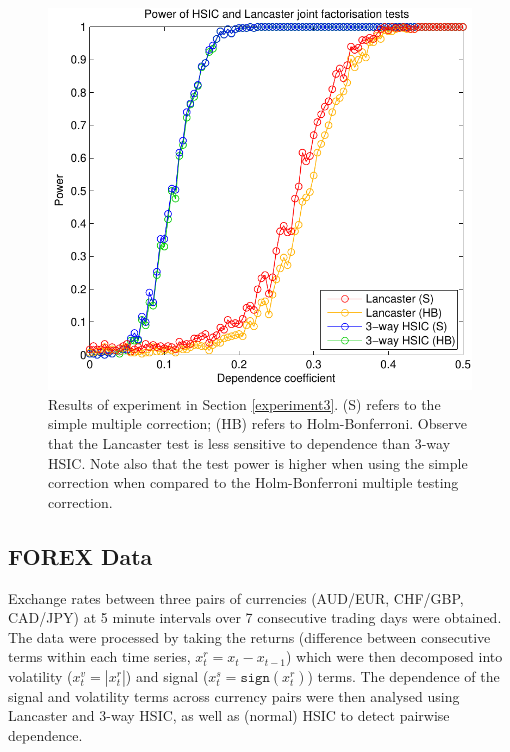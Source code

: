 \documentclass[]{article}
\begin{document}
\begin{figure}[ht]
\vskip 0.2in
\begin{center}
\centerline{\includegraphics[scale=0.6]{UAI_Figure3.pdf}}
\caption{Results of experiment in Section \ref{experiment3}. (S) refers to the simple multiple correction; (HB) refers to Holm-Bonferroni. Observe that the Lancaster test is less sensitive to dependence than 3-way HSIC. Note also that the test power is higher when using the simple correction when compared to the Holm-Bonferroni multiple testing correction.}
\label{strong-pairwise}
\end{center}
\vskip -0.2in
\end{figure} 

\subsection{FOREX Data}

Exchange rates between three pairs of currencies (AUD/EUR, CHF/GBP, CAD/JPY) at 5 minute intervals over 7 consecutive trading days were obtained. The data were processed by taking the returns (difference between consecutive terms within each time series, $x_t^r = x_t-x_{t-1}$) which were then decomposed into volatility ($x_t^v=|x_t^r|$) and signal ($x_t^s = \mathtt{sign}(x_t^r)$) terms. The dependence of the signal and volatility terms across currency pairs were then analysed using Lancaster and 3-way HSIC, as well as (normal) HSIC to detect pairwise dependence. 
\end{document}
